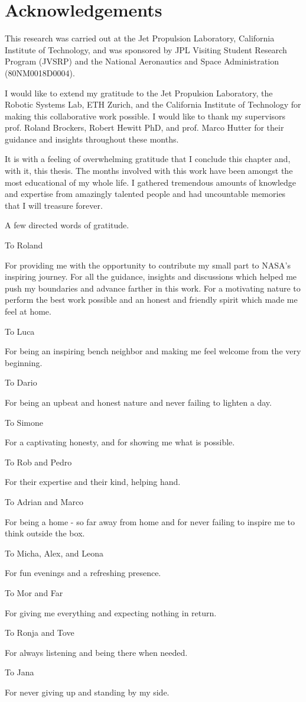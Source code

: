 \chapter*{Acknowledgements}

This research was carried out at the Jet Propulsion Laboratory, California Institute of Technology, and was sponsored by JPL Visiting Student Research Program (JVSRP) and the National Aeronautics and Space Administration (80NM0018D0004).

I would like to extend my gratitude to the Jet Propulsion Laboratory, the Robotic Systems Lab, ETH Zurich, and the California Institute of Technology for making this collaborative work possible. I would like to thank my supervisors prof. Roland Brockers, Robert Hewitt PhD, and prof. Marco Hutter for their guidance and insights throughout these months.

It is with a feeling of overwhelming gratitude that I conclude this chapter and, with it, this thesis. The months involved with this work have been amongst the most educational of my whole life. I gathered tremendous amounts of knowledge and expertise from amazingly talented people and had uncountable memories that I will treasure forever. 

A few directed words of gratitude.

To Roland

For providing me with the opportunity to contribute my small part to NASA's inspiring journey. For all the guidance, insights and discussions which helped me push my boundaries and advance farther in this work. For a motivating nature to perform the best work possible and an honest and friendly spirit which made me feel at home.

To Luca

For being an inspiring bench neighbor and making me feel welcome from the very beginning.

To Dario 

For being an upbeat and honest nature and never failing to lighten a day.

To Simone

For a captivating honesty, and for showing me what is possible. 

To Rob and Pedro

For their expertise and their kind, helping hand.

To Adrian and Marco

For being a home - so far away from home and for never failing to inspire me to think outside the box.

To Micha, Alex, and Leona

For fun evenings and a refreshing presence.

To Mor and Far 

For giving me everything and expecting nothing in return.

To Ronja and Tove

For always listening and being there when needed.

To Jana

For never giving up and standing by my side.